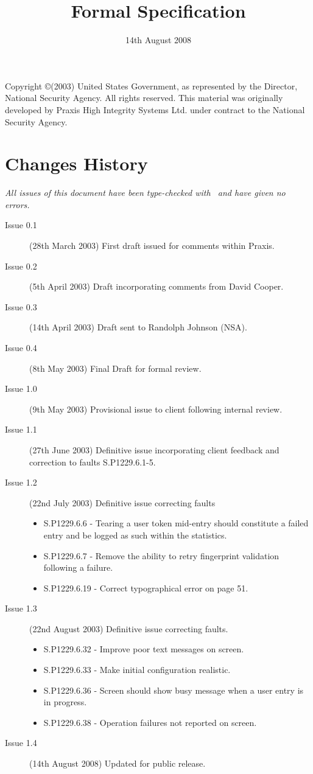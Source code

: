 \documentclass{pxcsdoc}
\title{Formal Specification}
\date{14th August 2008}
\begin{document}
\maketitle
%


\documentcontrol
Copyright \copyright (2003) United States Government, as represented by the
Director, National Security Agency. All rights reserved.
This material was originally developed by Praxis High Integrity
Systems Ltd. under contract to the National Security Agency.
\section*{Changes History}
\textit{All issues of this document have been type-checked with \fuzz~and have
  given no errors.}
\begin{description}
\item [Issue 0.1] 
(28th March 2003) First draft issued for comments within Praxis.
\item [Issue 0.2]
(5th April 2003) Draft incorporating comments from David Cooper.
\item [Issue 0.3]
(14th April 2003) Draft sent to Randolph Johnson (NSA).
\item [Issue 0.4]
(8th May 2003) Final Draft for formal review.
\item [Issue 1.0]
(9th May 2003) Provisional issue to client following internal review.
\item [Issue 1.1]
(27th June 2003) Definitive issue incorporating client feedback and
correction to faults S.P1229.6.1-5. 
\item [Issue 1.2]
(22nd July 2003) Definitive issue correcting faults 
\begin{itemize}
\item S.P1229.6.6 - Tearing a user token mid-entry should constitute a
failed entry and be logged as such within the statistics.
\item S.P1229.6.7 - Remove the ability to retry fingerprint validation
following a failure.
\item S.P1229.6.19 - Correct typographical error on page 51.
\end{itemize}
\item [Issue 1.3]
(22nd August 2003) Definitive issue correcting faults.
\begin{itemize}
\item S.P1229.6.32 - Improve poor text messages on screen.
\item S.P1229.6.33 - Make initial configuration realistic.
\item S.P1229.6.36 - Screen should show busy message when a user entry
is in progress.
\item S.P1229.6.38 - Operation failures not reported on screen.
\end{itemize}
\item [Issue 1.4]
(14th August 2008) Updated for public release.
\end{description}
\end{document}
